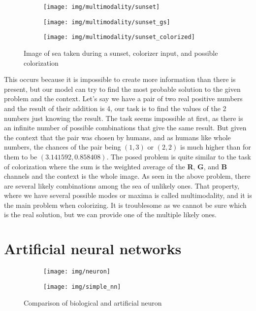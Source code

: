 \begin{figure}
	\centering
	\begin{subfigure}{.32\textwidth}
		\centering
		\texttt{[image: img/multimodality/sunset]}
	\end{subfigure}
	\begin{subfigure}{.32\textwidth}
		\centering
		\texttt{[image: img/multimodality/sunset\_gs]}
	\end{subfigure}
    \begin{subfigure}{.32\textwidth}
		\centering
		\texttt{[image: img/multimodality/sunset\_colorized]}
	\end{subfigure}
    \caption{Image of sea taken during a sunset, colorizer input, and possible colorization}
	\label{fig:multimodality_sunset}
\end{figure}

This occurs because it is impossible to create more information than there is present, 
but our model can try to find the most probable solution to the given problem and the context. 
Let's say we have a pair of two real positive numbers and the result of their 
addition is 4, our task is to find the values of the 2 numbers just knowing the 
result. The task seems impossible at first, as there is an infinite number of possible 
combinations that give the same result. But given the context that the pair was 
chosen by humans, and as humans like whole numbers, the chances of the pair being
$(1, 3)$ or $(2, 2)$ is much higher than for them to be $(3.141592, 0.858408)$. The posed
problem is quite similar to the task of colorization where the sum is the weighted 
average of the \textbf{R}, \textbf{G}, and \textbf{B} channels and the context is the 
whole image. As seen in the above problem, there are several likely combinations
among the sea of unlikely ones. That property, where we have several possible modes 
or maxima is called multimodality, and it is the main problem when colorizing. It is
troublesome as we cannot be sure which is the real solution, but we can provide one 
of the multiple likely ones.

\section{Artificial neural networks}

\begin{figure}
	\centering
	\begin{subfigure}{.49\textwidth}
		\centering
		\texttt{[image: img/neuron]}
	\end{subfigure}
	\begin{subfigure}{.49\textwidth}
		\centering
		\texttt{[image: img/simple\_nn]}
	\end{subfigure}
    \caption{Comparison of biological and artificial neuron}
	\label{fig:neuron}
\end{figure}

